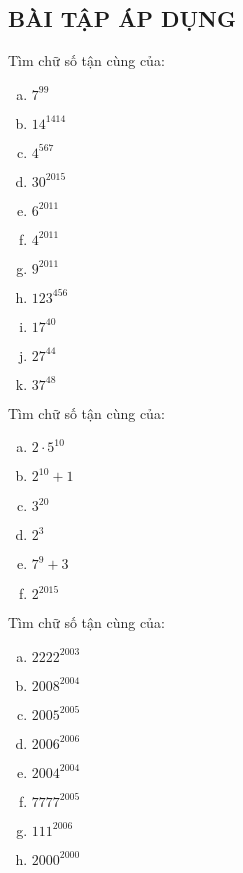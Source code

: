 \subsection{BÀI TẬP ÁP DỤNG}
\begin{bt}
Tìm chữ số tận cùng của:
\begin{multicols}{3}
\begin{enumerate}[a)]
\item $7^{99}$	
\item ${14}^{1414}$	
\item $4^{567}$
\item ${30}^{2015}$	
\item $6^{2011}$	
\item $4^{2011}$	
\item $9^{2011}$	
\item ${123}^{456}$	
\item ${17}^{40}$
\item ${27}^{44}$
\item ${37}^{48}$
\end{enumerate}
\end{multicols}
\end{bt}   \begin{bt}
 Tìm chữ số tận cùng của:
 \begin{multicols}{3}
 \begin{enumerate}[a)]
\item  $2\cdot {{5}^{10}}$	
\item ${{2}^{10}}+1$ 	
\item $3^{20}$
\item $2^3$	
\item ${{7}^{9}}+3$	
\item $2^{2015}$
\end{enumerate}
\end{multicols}
\end{bt}   \begin{bt}
Tìm chữ số tận cùng của:
\begin{multicols}{3}
\begin{enumerate}[a)]
\item ${2222}^{2003}$ 	
\item ${2008}^{2004}$	
\item ${2005}^{2005}$
\item ${2006}^{2006}$          	
\item ${2004}^{2004}$	
\item ${7777}^{2005}$
\item ${111}^{2006}$	
\item ${2000}^{2000}$	

\end{enumerate}
\end{multicols}
\end{bt}
